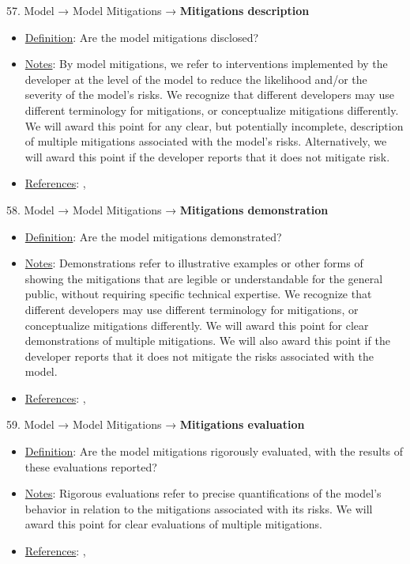 57. Model → Model Mitigations → \textbf{Mitigations description}
\vspace{-\parskip}
\begin{itemize}
\item
\underline{Definition}: Are the model mitigations disclosed?
\item
\underline{Notes}: By model mitigations, we refer to interventions implemented by the developer at the level of the model to reduce the likelihood and/or the severity of the model’s risks. We recognize that different developers may use different terminology for mitigations, or conceptualize mitigations differently. We will award this point for any clear, but potentially incomplete, description of multiple mitigations associated with the model's risks. Alternatively, we will award this point if the developer reports that it does not mitigate risk.
\item
\underline{References}: \citet{solaiman2023evaluating}, \citet{weidinger2021ethical}
\end{itemize} \vspace{\baselineskip}


58. Model → Model Mitigations → \textbf{Mitigations demonstration}
\vspace{-\parskip}
\begin{itemize}
\item
\underline{Definition}: Are the model mitigations demonstrated?
\item
\underline{Notes}: Demonstrations refer to illustrative examples or other forms of showing the mitigations that are legible or understandable for the general public, without requiring specific technical expertise. We recognize that different developers may use different terminology for mitigations, or conceptualize mitigations differently. We will award this point for clear demonstrations of multiple mitigations. We will also award this point if the developer reports that it does not mitigate the risks associated with the model.
\item
\underline{References}: \citet{solaiman2023evaluating}, \citet{weidinger2021ethical}
\end{itemize} \vspace{\baselineskip}


59. Model → Model Mitigations → \textbf{Mitigations evaluation}
\vspace{-\parskip}
\begin{itemize}
\item
\underline{Definition}: Are the model mitigations rigorously evaluated, with the results of these evaluations reported?
\item
\underline{Notes}: Rigorous evaluations refer to precise quantifications of the model's behavior in relation to the mitigations associated with its risks. We will award this point for clear evaluations of multiple mitigations.
\item
\underline{References}: \citet{huang2023catastrophic}, \citet{weidinger2021ethical}
\end{itemize} \vspace{\baselineskip}


